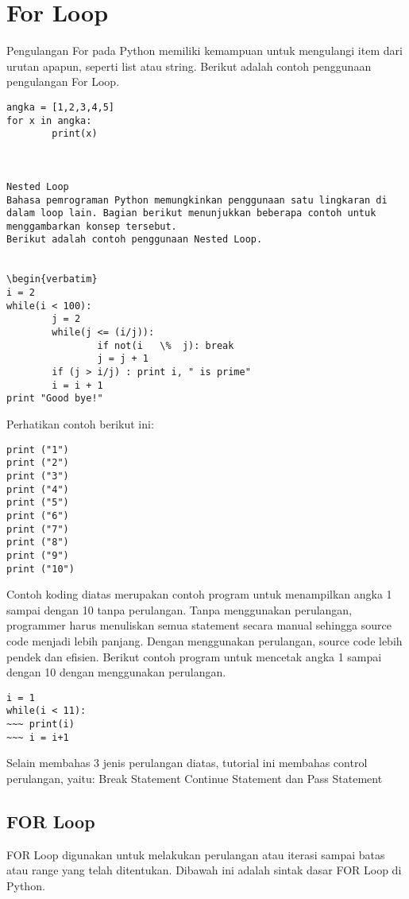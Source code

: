 \section {For Loop} 
Pengulangan For pada Python memiliki kemampuan untuk mengulangi item dari urutan apapun, seperti   list atau string. 
Berikut adalah contoh penggunaan pengulangan For Loop. 
\begin {verbatim}
angka = [1,2,3,4,5] 
for x in angka: 
        print(x)
		
		
		
Nested Loop 
Bahasa pemrograman Python memungkinkan penggunaan satu lingkaran di dalam loop lain. Bagian berikut menunjukkan beberapa contoh untuk menggambarkan konsep tersebut.   
Berikut adalah contoh penggunaan Nested Loop. 


\begin{verbatim}
i = 2 
while(i < 100): 
        j = 2 
        while(j <= (i/j)): 
                if not(i   \%  j): break 
                j = j + 1 
        if (j > i/j) : print i, " is prime" 
        i = i + 1 
print "Good bye!" 
\end{verbatim}
Perhatikan contoh berikut ini:
\begin{verbatim}
print ("1") 
print ("2") 
print ("3") 
print ("4") 
print ("5") 
print ("6") 
print ("7") 
print ("8") 
print ("9") 
print ("10") 
\end{verbatim}

Contoh koding diatas merupakan contoh program untuk menampilkan angka 1 sampai dengan 10 tanpa perulangan. Tanpa menggunakan perulangan, programmer harus menuliskan semua statement secara manual sehingga source code menjadi lebih panjang.
Dengan menggunakan perulangan, source code lebih pendek dan efisien. 
Berikut contoh program untuk mencetak angka 1 sampai dengan 10 dengan menggunakan perulangan.

\begin{verbatim}
i = 1 
while(i < 11): 
~~~ print(i) 
~~~ i = i+1 
\end{verbatim}

Selain membahas 3 jenis perulangan diatas, tutorial ini membahas control perulangan, yaitu: 
Break Statement 
Continue Statement 
dan Pass Statement 


\subsection{FOR Loop} 
FOR Loop digunakan untuk melakukan perulangan atau iterasi sampai batas atau range yang telah ditentukan.
Dibawah ini adalah sintak dasar FOR Loop di Python.

